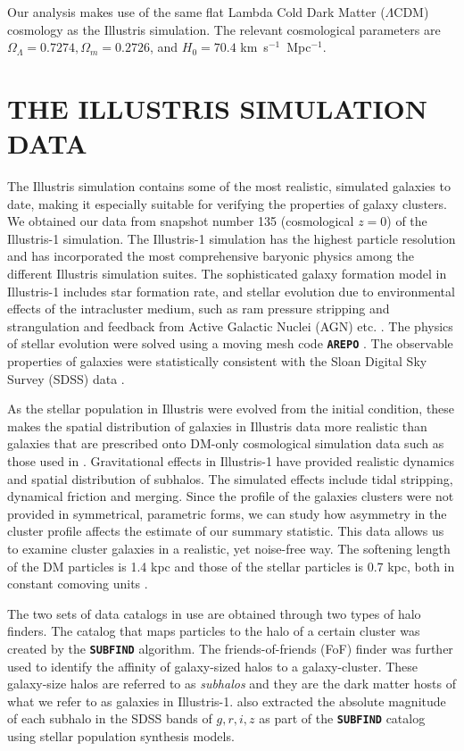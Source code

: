 	Our analysis makes use of the same flat Lambda Cold Dark Matter ($\Lambda$CDM) cosmology
as the Illustris simulation. The relevant cosmological parameters are
$\Omega_\Lambda = 0.7274, \Omega_m = 0.2726$, and $H_0 = 70.4$
km~s$^{-1}$~Mpc$^{-1}$.

\section{THE ILLUSTRIS SIMULATION DATA} 
\label{sec:illustris_sim}
The Illustris simulation contains some of the most
realistic, simulated galaxies to date, making it especially suitable for 
verifying the properties of galaxy clusters. We obtained our data from 
snapshot number 135 (cosmological $z=0$) of the Illustris-1 simulation. The Illustris-1
simulation has the highest particle resolution and has incorporated the most 
comprehensive baryonic physics among the different Illustris simulation suites. 
The sophisticated galaxy formation model in Illustris-1 
includes star formation rate, and stellar evolution due to
environmental effects of the intracluster medium, such as ram pressure stripping and
strangulation and feedback from Active Galactic Nuclei (AGN) etc. \citep{Genel2014a}.
The physics of stellar
evolution were solved using a moving mesh code {\bf \texttt{AREPO}} \citep{Springel2010}.
The observable properties of galaxies were statistically consistent
with the Sloan Digital Sky Survey (SDSS) data
\citep{Vogelsberger2014}. 

As the stellar population in Illustris were evolved from the initial condition,
these makes the spatial distribution of galaxies in  Illustris data more 
realistic than galaxies that are prescribed onto DM-only cosmological
simulation data such as those used in \cite{Harvey2013d}.  
Gravitational effects in Illustris-1 have provided realistic dynamics and
spatial distribution of subhalos. The simulated effects include
tidal stripping, dynamical friction and merging. 
Since the profile of the galaxies clusters were not
provided in symmetrical, parametric forms, we can study 
how asymmetry in the cluster profile affects the estimate of our summary 
statistic. This data allows us to examine cluster galaxies
in a realistic, yet noise-free way. The softening length of the DM particles is
1.4 kpc and those of the stellar particles is 
0.7 kpc, both in constant comoving units \citep{Genel2014a}.

The two sets of data catalogs in use are obtained through two types of halo
finders. The catalog that maps particles to the halo of a certain cluster was 
created by the {\bf \texttt{SUBFIND}} algorithm. The friends-of-friends (FoF) 
finder \citep{Davis1985} was further used to identify the affinity
of galaxy-sized halos to a galaxy-cluster. 
These galaxy-size halos are referred to as {\it subhalos} and 
they are the dark matter hosts of what we refer to as galaxies in Illustris-1. 
\cite{Vogelsberger2014a} also extracted the 
absolute magnitude of each subhalo in
the SDSS bands of $g, r, i, z$ as part of the {\bf
\texttt{SUBFIND}} catalog using stellar population synthesis models.

